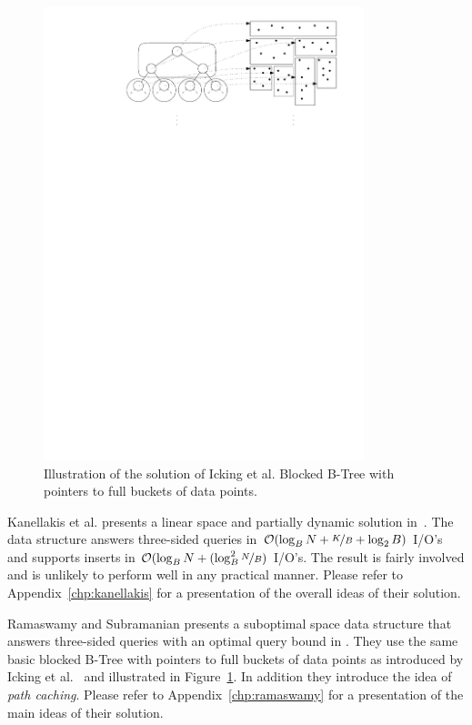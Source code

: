 \documentclass[twoside,11pt,openright]{report}
\begin{document}
\begin{figure}[b]
	\centering
		\includegraphics[width=0.83\textwidth]{../figures/icking_external_pst}
	\caption{Illustration of the solution of Icking et al. Blocked B-Tree with pointers to full buckets of data points.}
	\label{fig:icking_external_pst}
\end{figure}

Kanellakis et al. presents a linear space and partially dynamic solution in~\cite{Kanellakis1996589}. The data structure answers three-sided queries in $\mathcal{O}(\log_B N + \nicefrac{K}{B} + \log_2 B)$ I/O's and supports inserts in $\mathcal{O}(\log_B N + (\log^2_B \nicefrac{N}{B})$ I/O's. The result is fairly involved and is unlikely to perform well in any practical manner. Please refer to Appendix~\ref{chp:kanellakis} for a presentation of the overall ideas of their solution.

Ramaswamy and Subramanian presents a suboptimal space data structure that answers three-sided queries with an optimal query bound in \cite{Ramaswamy:1994:PCT:182591.182595}. They use the same basic blocked B-Tree with pointers to full buckets of data points as introduced by Icking et al.~\cite{Icking1988} and illustrated in Figure~\ref{fig:icking_external_pst}. In addition they introduce the idea of \textit{path caching}. Please refer to Appendix~\ref{chp:ramaswamy} for a presentation of the main ideas of their solution.
\end{document}
